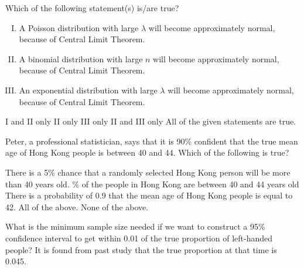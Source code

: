 \documentclass[letterpaper,10pt,addpoints]{exam}
\begin{document}
\begin{questions}
  \question Which of the following statement(s) is/are true?
  \begin{enumerate}[I.]
    \item A Poisson distribution with large $\lambda$ will become approximately normal, because of Central Limit Theorem.
    \item A binomial distribution with large $n$ will become approximately normal, because of Central Limit Theorem.
    \item An exponential distribution with large $\lambda$ will become approximately normal, because of Central Limit Theorem.
  \end{enumerate}
  \begin{choices}
    \correctchoice I and II only
    \choice II only
    \choice III only
    \choice II and III only
    \choice All of the given statements are true.
    \end{choices}

\question Peter, a professional statistician, says that it is 90\% confident that the true mean age of Hong Kong people is between 40 and 44. Which of the following is true?
\begin{choices}
  \choice There is a 5\% chance that a randomly selected Hong Kong person will be more than 40 years old.
  \% of the people in Hong Kong are between 40 and 44 years old
  \choice There is a probability of 0.9 that the mean age of Hong Kong people is equal to 42.
  \choice All of the above.
  \correctchoice None of the above.
\end{choices}


\question What is the minimum sample size needed if we want to construct a 95\% confidence interval to get within 0.01 of the true proportion of left-handed people? It is found from past study that the true proportion at that time is 0.045.
\begin{choices}
\end{choices}



\end{questions}
\end{document}
